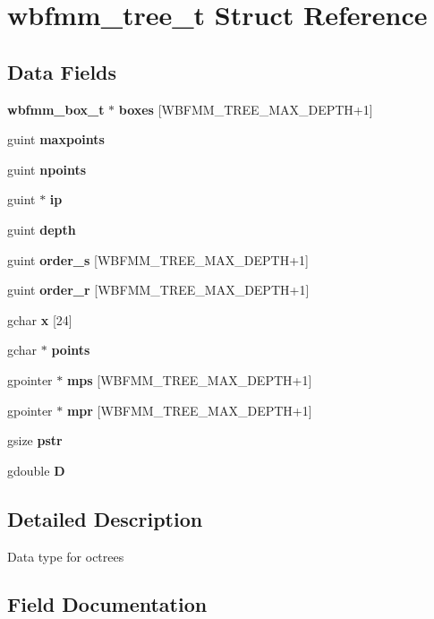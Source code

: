 \section{wbfmm\+\_\+tree\+\_\+t Struct Reference}
\label{structwbfmm__tree__t}
\subsection*{Data Fields}
\begin{DoxyCompactItemize}
\item 
\textbf{ wbfmm\+\_\+box\+\_\+t} $\ast$ \textbf{ boxes} [W\+B\+F\+M\+M\+\_\+\+T\+R\+E\+E\+\_\+\+M\+A\+X\+\_\+\+D\+E\+P\+TH+1]
\item 
guint \textbf{ maxpoints}
\item 
guint \textbf{ npoints}
\item 
guint $\ast$ \textbf{ ip}
\item 
guint \textbf{ depth}
\item 
guint \textbf{ order\+\_\+s} [W\+B\+F\+M\+M\+\_\+\+T\+R\+E\+E\+\_\+\+M\+A\+X\+\_\+\+D\+E\+P\+TH+1]
\item 
guint \textbf{ order\+\_\+r} [W\+B\+F\+M\+M\+\_\+\+T\+R\+E\+E\+\_\+\+M\+A\+X\+\_\+\+D\+E\+P\+TH+1]
\item 
gchar \textbf{ x} [24]
\item 
gchar $\ast$ \textbf{ points}
\item 
gpointer $\ast$ \textbf{ mps} [W\+B\+F\+M\+M\+\_\+\+T\+R\+E\+E\+\_\+\+M\+A\+X\+\_\+\+D\+E\+P\+TH+1]
\item 
gpointer $\ast$ \textbf{ mpr} [W\+B\+F\+M\+M\+\_\+\+T\+R\+E\+E\+\_\+\+M\+A\+X\+\_\+\+D\+E\+P\+TH+1]
\item 
gsize \textbf{ pstr}
\item 
gdouble \textbf{ D}
\end{DoxyCompactItemize}


\subsection{Detailed Description}
Data type for octrees 

\subsection{Field Documentation}
\mbox{\label{structwbfmm__tree__t_a2cec33cf396af727261fdb357e2a4de2}} 
